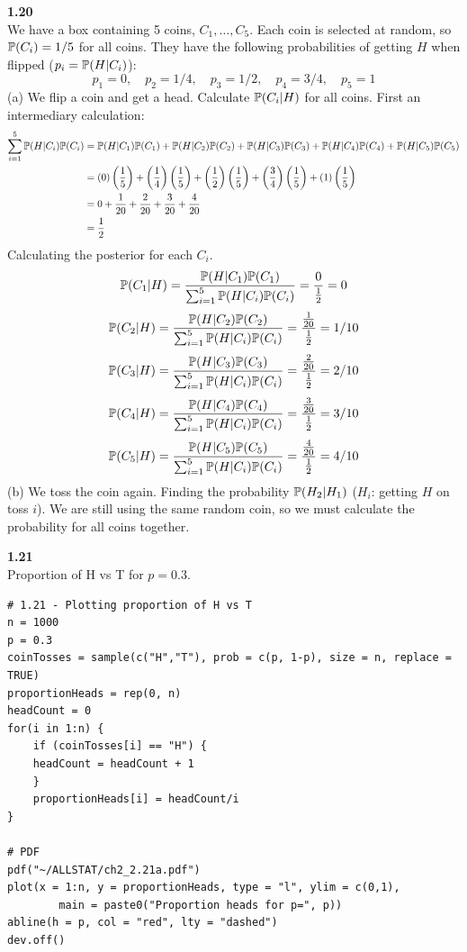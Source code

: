 \bigskip\noindent
\textbf{1.20}\\  %
We have a box containing 5 coins, $C_1,\ldots,C_5$. Each coin is selected at random, so $\P(C_i) = 1/5$ for all coins.
They have the following probabilities of
getting $H$ when flipped ($p_i = \P(H|C_i)$):
$$
p_1 = 0,\quad
p_2 = 1/4,\quad
p_3 = 1/2,\quad
p_4 = 3/4,\quad
p_5 = 1
$$
(a) We flip a coin and get a head. Calculate $\P(C_i|H)$ for all coins.
First an intermediary calculation:
\begin{align*}
    \sum_{i=1}^5 \P(H|C_i)\P(C_i) &= 
    \P(H|C_1)\P(C_1) + \P(H|C_2)\P(C_2) + \P(H|C_3)\P(C_3) + \P(H|C_4)\P(C_4) + \P(H|C_5)\P(C_5) \\
    &=
    \left(0\right)\left(\frac{1}{5}\right)
    + \left(\frac{1}{4}\right)\left(\frac{1}{5}\right)
    + \left(\frac{1}{2}\right)\left(\frac{1}{5}\right)
    + \left(\frac{3}{4}\right)\left(\frac{1}{5}\right)
    + \left(1\right)\left(\frac{1}{5}\right) \\
    &= 0 + \frac{1}{20} + \frac{2}{20} + \frac{3}{20} + \frac{4}{20} \\
    &= \frac{1}{2}
\end{align*}
Calculating the posterior for each $C_i$.
$$
\P(C_1|H) = 
\frac{\P(H|C_1)\P(C_1)}{\sum_{i=1}^5 \P(H|C_i)\P(C_i)}
= \frac{0}{\frac{1}{2}} = 0
$$
$$
\P(C_2|H) = 
\frac{\P(H|C_2)\P(C_2)}{\sum_{i=1}^5 \P(H|C_i)\P(C_i)}
= \frac{\frac{1}{20}}{\frac{1}{2}} = 1/10
$$
$$
\P(C_3|H) = 
\frac{\P(H|C_3)\P(C_3)}{\sum_{i=1}^5 \P(H|C_i)\P(C_i)}
= \frac{\frac{2}{20}}{\frac{1}{2}} = 2/10
$$
\newpage\noindent
$$
\P(C_4|H) = 
\frac{\P(H|C_4)\P(C_4)}{\sum_{i=1}^5 \P(H|C_i)\P(C_i)}
= \frac{\frac{3}{20}}{\frac{1}{2}} = 3/10
$$
$$
\P(C_5|H) = 
\frac{\P(H|C_5)\P(C_5)}{\sum_{i=1}^5 \P(H|C_i)\P(C_i)}
= \frac{\frac{4}{20}}{\frac{1}{2}} = 4/10
$$
(b) We toss the coin again. Finding the probability $\P(H_2|H_1)$ ($H_i$: getting $H$ on toss $i$).
We are still using the same random coin, so we must calculate the probability for all coins together.


\newpage\noindent
\textbf{1.21}\\  %
Proportion of H vs T for $p=0.3$.
\begin{lstlisting}[style=RSyntax, title=R]
# 1.21 - Plotting proportion of H vs T
n = 1000
p = 0.3
coinTosses = sample(c("H","T"), prob = c(p, 1-p), size = n, replace = TRUE)
proportionHeads = rep(0, n)
headCount = 0
for(i in 1:n) {
    if (coinTosses[i] == "H") {
    headCount = headCount + 1
    } 
    proportionHeads[i] = headCount/i
} 

# PDF
pdf("~/ALLSTAT/ch2_2.21a.pdf")
plot(x = 1:n, y = proportionHeads, type = "l", ylim = c(0,1),
        main = paste0("Proportion heads for p=", p))
abline(h = p, col = "red", lty = "dashed")
dev.off()         
\end{lstlisting}


